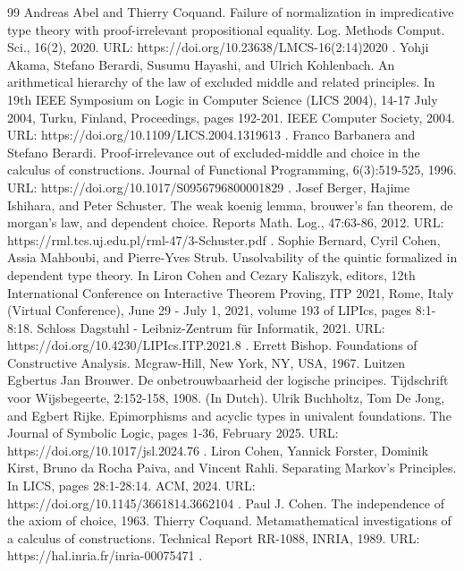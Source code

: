 \begin{thebibliography}{99}
 Andreas Abel and Thierry Coquand. Failure of normalization in impredicative type theory with proof-irrelevant propositional equality. Log. Methods Comput. Sci., 16(2), 2020. URL: https://doi.org/10.23638/LMCS-16(2:14)2020 .
 Yohji Akama, Stefano Berardi, Susumu Hayashi, and Ulrich Kohlenbach. An arithmetical hierarchy of the law of excluded middle and related principles. In 19th IEEE Symposium on Logic in Computer Science (LICS 2004), 14-17 July 2004, Turku, Finland, Proceedings, pages 192-201. IEEE Computer Society, 2004. URL: https://doi.org/10.1109/LICS.2004.1319613 .
 Franco Barbanera and Stefano Berardi. Proof-irrelevance out of excluded-middle and choice in the calculus of constructions. Journal of Functional Programming, 6(3):519-525, 1996. URL: https://doi.org/10.1017/S0956796800001829 .
 Josef Berger, Hajime Ishihara, and Peter Schuster. The weak koenig lemma, brouwer’s fan theorem, de morgan’s law, and dependent choice. Reports Math. Log., 47:63-86, 2012. URL: https://rml.tcs.uj.edu.pl/rml-47/3-Schuster.pdf .
 Sophie Bernard, Cyril Cohen, Assia Mahboubi, and Pierre-Yves Strub. Unsolvability of the quintic formalized in dependent type theory. In Liron Cohen and Cezary Kaliszyk, editors, 12th International Conference on Interactive Theorem Proving, ITP 2021, Rome, Italy (Virtual Conference), June 29 - July 1, 2021, volume 193 of LIPIcs, pages 8:1-8:18. Schloss Dagstuhl - Leibniz-Zentrum für Informatik, 2021. URL: https://doi.org/10.4230/LIPIcs.ITP.2021.8 .
 Errett Bishop. Foundations of Constructive Analysis. Mcgraw-Hill, New York, NY, USA, 1967.
 Luitzen Egbertus Jan Brouwer. De onbetrouwbaarheid der logische principes. Tijdschrift voor Wijsbegeerte, 2:152-158, 1908. (In Dutch).
 Ulrik Buchholtz, Tom De Jong, and Egbert Rijke. Epimorphisms and acyclic types in univalent foundations. The Journal of Symbolic Logic, pages 1-36, February 2025. URL: https://doi.org/10.1017/jsl.2024.76 .
 Liron Cohen, Yannick Forster, Dominik Kirst, Bruno da Rocha Paiva, and Vincent Rahli. Separating Markov’s Principles. In LICS, pages 28:1-28:14. ACM, 2024. URL: https://doi.org/10.1145/3661814.3662104 .
 Paul J. Cohen. The independence of the axiom of choice, 1963.
 Thierry Coquand. Metamathematical investigations of a calculus of constructions. Technical Report RR-1088, INRIA, 1989. URL: https://hal.inria.fr/inria-00075471 .

\end{thebibliography}
